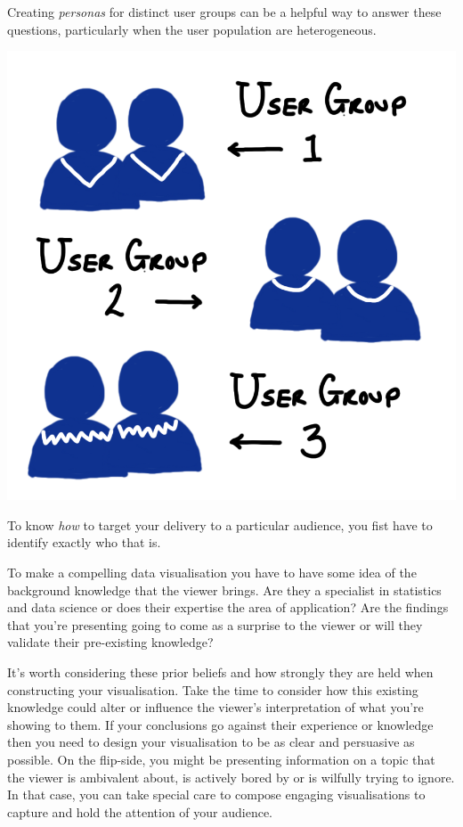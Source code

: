 \documentclass[
  letterpaper,
  DIV=11,
  numbers=noendperiod]{scrreprt}
\begin{document}
Creating \emph{personas} for distinct user groups can be a helpful way
to answer these questions, particularly when the user population are
heterogeneous.

\includegraphics{images/303-data-visualisation/user-groups.png}

To know \emph{how} to target your delivery to a particular audience, you
fist have to identify exactly who that is.

To make a compelling data visualisation you have to have some idea of
the background knowledge that the viewer brings. Are they a specialist
in statistics and data science or does their expertise the area of
application? Are the findings that you're presenting going to come as a
surprise to the viewer or will they validate their pre-existing
knowledge?

It's worth considering these prior beliefs and how strongly they are
held when constructing your visualisation. Take the time to consider how
this existing knowledge could alter or influence the viewer's
interpretation of what you're showing to them. If your conclusions go
against their experience or knowledge then you need to design your
visualisation to be as clear and persuasive as possible. On the
flip-side, you might be presenting information on a topic that the
viewer is ambivalent about, is actively bored by or is wilfully trying
to ignore. In that case, you can take special care to compose engaging
visualisations to capture and hold the attention of your audience.
\end{document}
